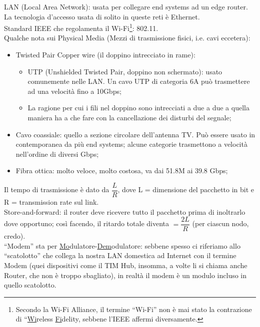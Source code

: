 \noindent {}LAN (Local Area Network): usata per collegare end systems ad un edge router. La tecnologia d'accesso usata di solito in queste reti è Ethernet. \\

\noindent Standard IEEE che regolamenta il Wi-Fi\footnote{Secondo la Wi-Fi Alliance, il termine ``Wi-Fi'' non è mai stato la contrazione di ``\underline{Wi}reless \underline{Fi}delity, sebbene l'IEEE affermi diversamente.}: 802.11. \\

\noindent Qualche nota sui Physical Media (Mezzi di trasmissione fisici, i.e. cavi eccetera):
\begin{itemize}
    \item Twisted Pair Copper wire (il doppino intrecciato in rame):
    \begin{itemize}
        \item UTP (Unshielded Twisted Pair, doppino non schermato): usato comunemente nelle LAN. Un cavo UTP di categoria 6A può trasmettere ad una velocità fino a 10Gbps;
        \item La ragione per cui i fili nel doppino sono intrecciati a due a due a quella maniera ha a che fare con la cancellazione dei disturbi del segnale;
    \end{itemize}
    \item Cavo coassiale: quello a sezione circolare dell'antenna TV. Può essere usato in contemporanea da più end systems; alcune categorie trasmettono a velocità nell'ordine di diversi Gbps;
    \item Fibra ottica: molto veloce, molto costosa, va dai 51.8M ai 39.8 Gbps;
\end{itemize}

\noindent {}Il tempo di trasmissione è dato da $\dfrac{L}{R}$, dove L = dimensione del pacchetto in bit e R = transmission rate sul link.\\

\noindent {}Store-and-forward: il router deve ricevere tutto il pacchetto prima di inoltrarlo dove opportuno; così facendo, il ritardo totale diventa $=\dfrac{2L}{R}$ (per ciascun nodo, credo).\\

\noindent {}``Modem'' sta per \underline{Mo}dulatore-\underline{Dem}odulatore: sebbene spesso ci riferiamo allo ``scatolotto'' che collega la nostra LAN domestica ad Internet con il termine Modem (quei dispositivi come il TIM Hub, insomma, a volte li si chiama anche Router, che non è troppo sbagliato), in realtà il modem è un modulo incluso in quello scatolotto.\\

